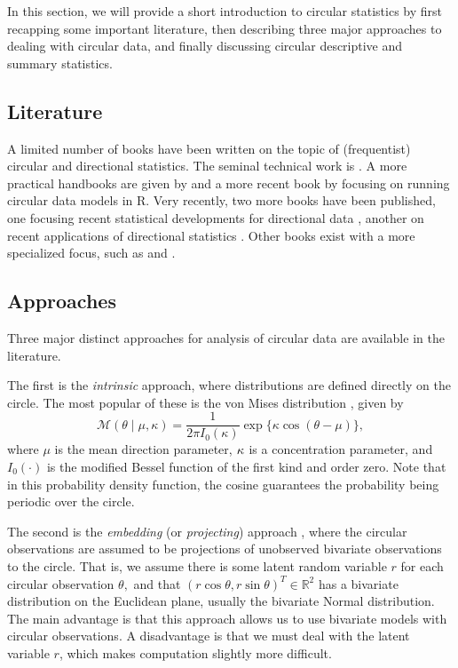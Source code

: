 \documentclass[12pt, a4paper]{book}\usepackage[]{graphicx}\usepackage{xcolor}
\let\proglang=\textsf
\begin{document}
In this section, we will provide a short introduction to circular statistics by first recapping some important literature, then describing three major approaches to dealing with circular data, and finally discussing circular descriptive and summary statistics.

\subsection*{Literature}

A limited number of books have been written on the topic of (frequentist) circular and directional statistics. The seminal technical work is \citet{mardia2009directional}. A more practical handbooks are given by \citet{fisher1995statistical} and a more recent book by \citet{pewsey2013circular} focusing on running circular data models in \proglang{R}. Very recently, two more books have been published, one focusing recent statistical developments for directional data \citep{ley2017modern}, another on recent applications of directional statistics \citep{ley2018applied}. Other books exist with a more specialized focus, such as \citet{batschelet1981circular} and \citet{jammalamadaka2001topics}.

\subsection*{Approaches}

Three major distinct approaches for analysis of circular data are available in the literature.

The first is the \textit{intrinsic} approach, where distributions are defined directly on the circle. The most popular of these is the von Mises distribution \cite{von1918ganzzahligkeit}, given by
\begin{equation}
\mathcal{M}(\theta \mid \mu, \kappa) = \frac{1}{2 \pi I_0(\kappa)} \exp\{\kappa \cos(\theta - \mu)\},
\end{equation}
where $\mu$ is the mean direction parameter, $\kappa$ is a concentration parameter, and $I_0(\cdot)$ is the modified Bessel function of the first kind and order zero. Note that in this probability density function, the cosine guarantees the probability being periodic over the circle.

The second is the  \textit{embedding} (or \textit{projecting}) approach \citep{presnell1998projected, Nunez-Antonio2005}, where the circular observations are assumed to be projections of unobserved bivariate observations to the circle. That is, we assume there is some latent random variable $r$ for each circular observation $\theta,$ and that $(r \cos\theta, r \sin\theta)^T \in \mathbb{R}^2$  has a bivariate distribution on the Euclidean plane, usually the bivariate Normal distribution. The main advantage is that this approach allows us to use bivariate models with circular observations. A disadvantage is that we must deal with the latent variable $r$, which makes computation slightly more difficult.
\end{document}

